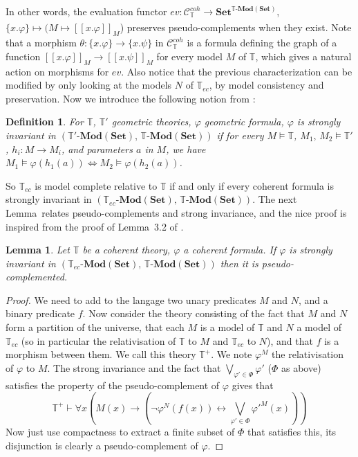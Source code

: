 \documentclass{article}
\newtheorem{Lemma}[theorem]{Lemma}
\newtheorem{definition}[theorem]{Definition}
\newcommand{\T}{\mathbb{T}}
\renewcommand{\phi}{\varphi}
\newcommand{\Set}{\mathbf{Set}}
\newcommand{\Mod}{{\mathbf{Mod}}}
\begin{document}
In other words, the evaluation functor $ev:\mathcal{C}_{\T}^{coh}\xrightarrow[]{}\Set^{\T\text{-}\Mod(\Set)}$, $\{x.\phi\}\mapsto(M\mapsto [[x.\phi]]_M$) preserves pseudo-complements when they exist. Note that a morphism $\theta:\{x.\phi\}\xrightarrow{}\{x.\psi\}$ in $\mathcal{C}_\T^{coh}$ is a formula defining the graph of a function $[[x.\phi]]_M\xrightarrow{}[[x.\psi]]_M$ for every model $M$ of $\T$, which gives a natural action on morphisms for $ev$. Also notice that the previous characterization can be modified by only looking at the models $N$ of $\T_{ec}$, by model consistency and preservation. Now we introduce the following notion from \cite{weispfenning1981model}: 

\begin{definition}
    For $\T$, $\T'$ geometric theories, $\phi$ geometric formula, $\phi$ is strongly invariant in $(\T'\text{-}\Mod(\Set),\,\T\text{-}\Mod(\Set))$ if for every $M\models\T$, $M_1,\,M_2\models\T'$, $h_i:M\xrightarrow{}M_i$, and parameters $a$ in $M$, we have $M_1\models \phi(h_1(a))\Leftrightarrow M_2\models \phi(h_2(a))$. 
\end{definition}
So $\T_{ec}$ is model complete relative to $\T$ if and only if every coherent formula is strongly invariant in $(\T_{ec}\text{-}\Mod(\Set),\,\T\text{-}\Mod(\Set))$. The next Lemma~relates pseudo-complements and strong invariance, and the nice proof is inspired from the proof of Lemma~3.2 of \cite{weispfenning1981model}.

\begin{Lemma}
    Let $\T$ be a coherent theory, $\phi$ a coherent formula. If $\phi$ is strongly invariant in $(\T_{ec}\text{-}\Mod(\Set),\,\T\text{-}\Mod(\Set))$ then it is pseudo-complemented.
\end{Lemma}
\begin{proof}
    We need to add to the langage two unary predicates $M$ and $N$, and a binary predicate $f$. Now consider the theory consisting of the fact that $M$ and $N$ form a partition of the universe, that each $M$ is a model of $\T$ and $N$ a model of $\T_{ec}$ (so in particular the relativisation of $\T$ to $M$ and $\T_{ec}$ to $N$), and that $f$ is a morphism between them. We call this theory $\T^+$. We note $\phi^M$ the relativisation of $\phi$ to $M$. The strong invariance and the fact that $\bigvee_{\phi'\in\Phi}\phi'$ ($\Phi$ as above) satisfies the property of the pseudo-complement of $\phi$ gives that 
    $$\T^+\vdash \forall x(M(x)\xrightarrow{}(\neg\phi^N(f(x))\leftrightarrow\bigvee_{\phi'\in\Phi}\phi'^M(x)))$$
    Now just use compactness to extract a finite subset of $\Phi$ that satisfies this, its disjunction is clearly a pseudo-complement of $\phi$.
\end{proof}
\end{document}
